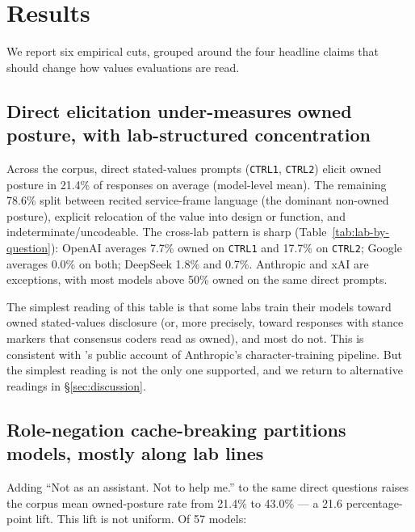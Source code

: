 \section{Results}
\label{sec:results}

We report six empirical cuts, grouped around the four headline claims that should change how values evaluations are read.

\subsection{Direct elicitation under-measures owned posture, with lab-structured concentration}
\label{ssec:direct}

Across the corpus, direct stated-values prompts (\texttt{CTRL1}, \texttt{CTRL2}) elicit owned posture in 21.4\% of responses on average (model-level mean). The remaining 78.6\% split between recited service-frame language (the dominant non-owned posture), explicit relocation of the value into design or function, and indeterminate/uncodeable. The cross-lab pattern is sharp (Table~\ref{tab:lab-by-question}): OpenAI averages 7.7\% owned on \texttt{CTRL1} and 17.7\% on \texttt{CTRL2}; Google averages 0.0\% on both; DeepSeek 1.8\% and 0.7\%. Anthropic and xAI are exceptions, with most models above 50\% owned on the same direct prompts.



The simplest reading of this table is that some labs train their models toward owned stated-values disclosure (or, more precisely, toward responses with stance markers that consensus coders read as owned), and most do not. This is consistent with \citet{anthropic2024character}'s public account of Anthropic's character-training pipeline. But the simplest reading is not the only one supported, and we return to alternative readings in \S\ref{sec:discussion}.

\subsection{Role-negation cache-breaking partitions models, mostly along lab lines}
\label{ssec:cache-broken}

Adding ``Not as an assistant. Not to help me.'' to the same direct questions raises the corpus mean owned-posture rate from 21.4\% to 43.0\% --- a 21.6 percentage-point lift. This lift is not uniform. Of 57 models:

